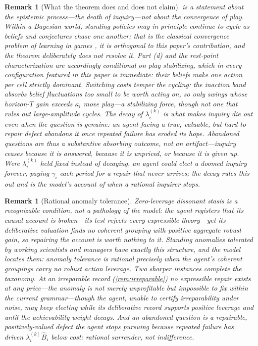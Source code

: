 \documentclass[11pt]{article}
\newtheorem{remark}[assumption]{Remark}
\theoremstyle{definition}
\begin{document}
\begin{remark}[What the theorem does and does not claim]
\label{rem:scope}
 is a statement about the epistemic process---the death of inquiry---not about the convergence of play.
Within a Bayesian world, standing policies may in principle continue to cycle as beliefs and conjectures chase one another; that is the classical convergence problem of learning in games \citep{FudenbergLevine1993,KalaiLehrer1993a}, it is orthogonal to this paper's contribution, and the theorem deliberately does not resolve it.
Part (d) and the rest-point characterization are accordingly conditional on play stabilizing, which in every configuration featured in this paper is immediate: their beliefs make one action per cell strictly dominant.
Switching costs temper the cycling: the inaction band absorbs belief fluctuations too small to be worth acting on, so only swings whose horizon-$T$ gain exceeds $\kappa_i$ move play---a stabilizing force, though not one that rules out large-amplitude cycles.
The decay of $\lambda_i^{(k)}$ is what makes inquiry die out even when the question is genuine: an agent facing a true, valuable, but hard-to-repair defect abandons it once repeated failure has eroded its hope.
Abandoned questions are thus a substantive absorbing outcome, not an artifact---inquiry ceases because it is answered, because it is unpriced, or because it is given up.
Were $\lambda_i^{(k)}$ held fixed instead of decaying, an agent could elect a doomed inquiry forever, paying $\gamma_i$ each period for a repair that never arrives; the decay rules this out and is the model's account of when a rational inquirer stops.
\end{remark}

\begin{remark}[Rational anomaly tolerance]
\label{rem:anomaly}
Zero-leverage dissonant stasis is a recognizable condition, not a pathology of the model: the agent registers that its causal account is broken---its test rejects every expressible theory---yet its deliberative valuation finds no coherent grouping with positive aggregate robust gain, so repairing the account is worth nothing to it.
Standing anomalies tolerated by working scientists and managers have exactly this structure, and the model locates them: anomaly tolerance is rational precisely when the agent's coherent groupings carry no robust action leverage.
Two sharper instances complete the taxonomy.
At an irreparable record (\cref{rem:irreparable}) no expressible repair exists at any price---the anomaly is not merely unprofitable but impossible to fix within the current grammar---though the agent, unable to certify irreparability under noise, may keep electing while its deliberative record supports positive leverage and until the achievability weight decays.
And an \emph{abandoned question} is a repairable, positively-valued defect the agent stops pursuing because repeated failure has driven $\lambda_i^{(k)}\widehat B_i$ below cost: rational surrender, not indifference.
\end{remark}
\end{document}
